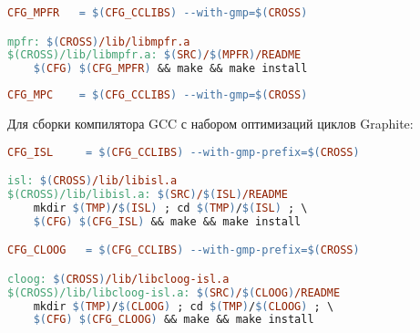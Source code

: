 \begin{lstlisting}[language=make]
CFG_MPFR   = $(CFG_CCLIBS) --with-gmp=$(CROSS)

mpfr: $(CROSS)/lib/libmpfr.a
$(CROSS)/lib/libmpfr.a: $(SRC)/$(MPFR)/README
	$(CFG) $(CFG_MPFR) && make && make install
\end{lstlisting}

\begin{lstlisting}[language=make]
CFG_MPC    = $(CFG_CCLIBS) --with-gmp=$(CROSS)
\end{lstlisting}

Для сборки компилятора GCC с набором оптимизаций циклов Graphite:

\begin{lstlisting}[language=make]
CFG_ISL		= $(CFG_CCLIBS) --with-gmp-prefix=$(CROSS)

isl: $(CROSS)/lib/libisl.a
$(CROSS)/lib/libisl.a: $(SRC)/$(ISL)/README
	mkdir $(TMP)/$(ISL) ; cd $(TMP)/$(ISL) ; \ 
	$(CFG) $(CFG_ISL) && make && make install

CFG_CLOOG	= $(CFG_CCLIBS) --with-gmp-prefix=$(CROSS)

cloog: $(CROSS)/lib/libcloog-isl.a
$(CROSS)/lib/libcloog-isl.a: $(SRC)/$(CLOOG)/README
	mkdir $(TMP)/$(CLOOG) ; cd $(TMP)/$(CLOOG) ; \ 
	$(CFG) $(CFG_CLOOG) && make && make install
\end{lstlisting}
